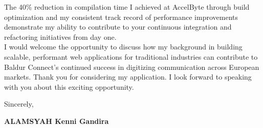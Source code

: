 \documentclass[12pt]{article}
\newcommand{\firstname}{Kenni Gandira}
\newcommand{\lastname}{Alamsyah}
\newcommand{\mainColor}{redBlood} %
\newlength{\spacebox}
\newcommand{\svspace}{\vspace*{0.5em}}
\newcommand{\signature}{
    \svspace
    \parbox{3\spacebox}{
      Sincerely,\par
      \svspace \hspace{-0.3em}
      \textbf{\color{\mainColor} \MakeUppercase{\lastname} \color{black} \firstname}\par
      \svspace \svspace
      \Huge \faPenNib\par
    }\par
}
\begin{document}
{  The 40\% reduction in compilation time I achieved at AccelByte through build optimization and my consistent track record of performance improvements demonstrate my ability to contribute to your continuous integration and refactoring initiatives from day one. \\

}{I would welcome the opportunity to discuss how my background in building scalable, performant web applications for traditional industries can contribute to Baldur Connect's continued success in digitizing communication across European markets. Thank you for considering my application. I look forward to speaking with you about this exciting opportunity.}
\signature
\end{document}
